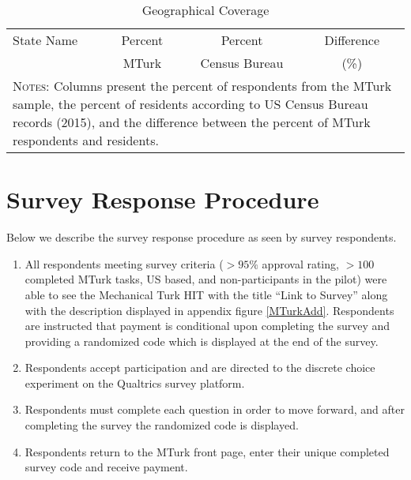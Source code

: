 \documentclass[a4paper, 11pt]{article}
\begin{document}
\clearpage

\begingroup
\setlength{\LTleft}{-20cm plus -1fill}
\setlength{\LTright}{\LTleft}
\begin{longtable}{lccc}
  \caption{Geographical Coverage} \label{tab:cover} \\
  \hline
  State Name & Percent & Percent & Difference \\
             & MTurk      & Census Bureau & (\%)          \\ \hline \endhead
  
  \hline
  \multicolumn{4}{p{10.4cm}}{{\footnotesize\textsc{Notes:} Columns present the percent of respondents from the MTurk sample, the percent of residents according to US Census Bureau records (2015), and the difference between the percent of MTurk respondents and residents.}}
\end{longtable}
\endgroup





\section{Survey Response Procedure}
\label{app:procedure}
Below we describe the survey response procedure as seen by survey respondents.
\begin{enumerate}
\item All respondents meeting survey criteria ($>95\%$ approval rating, $>100$ completed MTurk tasks, US based, and non-participants in the pilot) were able to see the Mechanical Turk HIT with the title ``Link to Survey'' along with the description displayed in appendix figure \ref{MTurkAdd}. Respondents are instructed that payment is conditional upon completing the survey and providing a randomized code which is displayed at the end of the survey.
\item Respondents accept participation and are directed to the discrete choice experiment on the Qualtrics survey platform.
\item Respondents must complete each question in order to move forward, and after completing the survey the randomized code is displayed.
\item Respondents return to the MTurk front page, enter their unique completed survey code and receive payment.
\end{enumerate}
\end{document}
